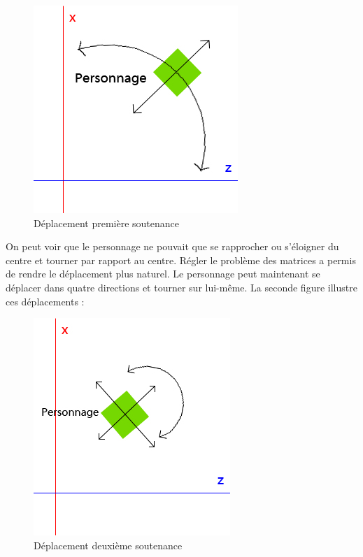 \documentclass{article}
\begin{document}
\begin{figure}[h]
\begin{center}
\includegraphics[scale=0.5]{deplac1.jpg}
\caption{Déplacement première soutenance}
\end{center}
\end{figure}
On peut voir que le personnage ne pouvait que se rapprocher ou s'éloigner du centre et tourner par rapport au centre. Régler le problème des matrices a permis de rendre le déplacement plus naturel. Le personnage peut maintenant se déplacer dans quatre directions et tourner sur lui-même. La seconde figure illustre ces déplacements : 

\begin{figure}[h]
\begin{center}
\includegraphics[scale=0.5]{deplac2.jpg} 
\caption{Déplacement deuxième soutenance}
\end{center}
\end{figure}
\end{document}
